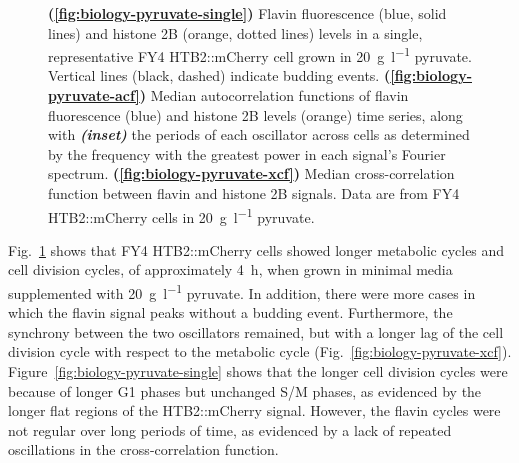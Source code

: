 \begin{figure}
  \caption{
    \textbf{(\ref{fig:biology-pyruvate-single})}
    Flavin fluorescence (blue, solid lines) and histone 2B (orange, dotted lines) levels in a single, representative FY4 HTB2::mCherry cell grown in \SI{20}{\gram~\litre^{-1}} pyruvate.
    Vertical lines (black, dashed) indicate budding events.
    \textbf{(\ref{fig:biology-pyruvate-acf})}
    Median autocorrelation functions of flavin fluorescence (blue) and histone 2B levels (orange) time series, along with \textit{\textbf{(inset)}} the periods of each oscillator across cells as determined by the frequency with the greatest power in each signal's Fourier spectrum.
    \textbf{(\ref{fig:biology-pyruvate-xcf})}
    Median cross-correlation function between flavin and histone 2B signals.
    Data are from FY4 HTB2::mCherry cells in \SI{20}{\gram~\litre^{-1}} pyruvate.
  }
  \label{fig:biology-pyruvate}
\end{figure}

Fig.\ \ref{fig:biology-pyruvate} shows that FY4 HTB2::mCherry cells showed longer metabolic cycles and cell division cycles, of approximately \SI{4}{\hour}, when grown in minimal media supplemented with \SI{20}{\gram~\litre^{-1}} pyruvate.
In addition, there were more cases in which the flavin signal peaks without a budding event. %
Furthermore, the synchrony between the two oscillators remained, but with a longer lag of the cell division cycle with respect to the metabolic cycle (Fig.\ \ref{fig:biology-pyruvate-xcf}).
Figure~\ref{fig:biology-pyruvate-single} shows that the longer cell division cycles were because of longer G1 phases but unchanged S/M phases, as evidenced by the longer flat regions of the HTB2::mCherry signal.
However, the flavin cycles were not regular over long periods of time, as evidenced by a lack of repeated oscillations in the cross-correlation function.




